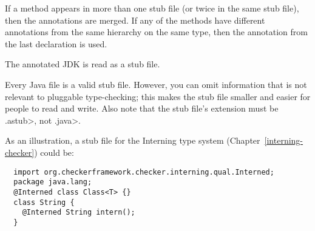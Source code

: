 If a method appears in more than one stub file (or twice in the same
stub file), then the annotations are merged. If any of the
methods have different annotations from the same hierarchy on the same type,
then the annotation from the last declaration is used.

The annotated JDK is read as a stub file.



Every Java file is a valid stub file.  However, you can omit information
that is not relevant to pluggable type-checking; this makes the stub file
smaller and easier for people to read and write.
Also note that the stub file's extension must be \<.astub>, not \<.java>.

As an illustration, a stub file for the Interning type system
(Chapter~\ref{interning-checker}) could be:

\begin{Verbatim}
  import org.checkerframework.checker.interning.qual.Interned;
  package java.lang;
  @Interned class Class<T> {}
  class String {
    @Interned String intern();
  }
\end{Verbatim}

